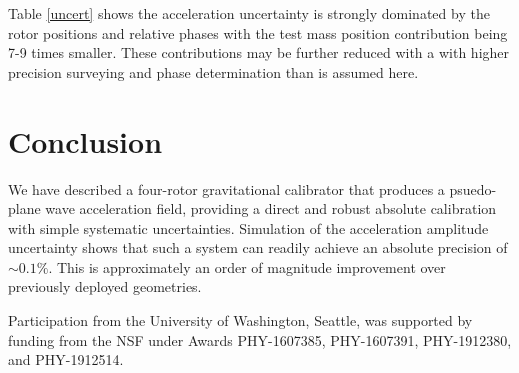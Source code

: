 \documentclass[superscriptaddress, twocolumn, prd]{revtex4-1}
\begin{document}
Table \ref{uncert} shows the acceleration uncertainty is strongly dominated by the rotor positions and relative phases with the test mass position contribution being 7-9 times smaller. These contributions may be further reduced with a  with higher precision surveying and phase determination than is assumed here.
\\
\section{Conclusion} 
\quad We have described a four-rotor gravitational calibrator that produces a psuedo-plane wave acceleration field, providing a direct and robust absolute calibration with simple systematic uncertainties. Simulation of the acceleration amplitude uncertainty shows that such a system can readily achieve an absolute precision of $\sim0.1\%$. This is approximately an order of magnitude improvement over previously deployed geometries. \cite{ncal} 

\begin{acknowledgements}

Participation from the University of Washington, Seattle, was supported by funding from the NSF under Awards PHY-1607385, PHY-1607391, PHY-1912380, and PHY-1912514.

\end{acknowledgements}


 

\end{document}
